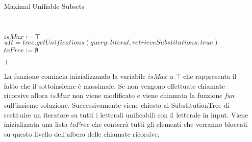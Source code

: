 \documentclass[./main.tex]{subfiles}
\begin{document}
\begin{algorithm}[H] \label{alg:mus}
    \caption{Maximal Unifiable Subsets}
    \\

$isMax := \top$\;
$uIt = tree.getUnifications(query: literal, retrieveSubstitutions: true)$\;
$toFree := \emptyset$\;

\Return $\top$\;
\end{algorithm}

La funzione comincia inizializzando la variabile $isMax$ a $\top$ che rappresenta il fatto che il sottoinsieme è massimale.
Se non vengono effettuate chiamate ricorsive allora $isMax$ non viene modificato
e viene chiamata la funzione \textit{fun} sull'insieme soluzione.
Successivamente viene chiesto al SubstitutionTree di restituire un iteratore
su tutti i letterali unificabili con il letterale in input.
Viene inizializzata una lista $toFree$ che conterrà tutti gli elementi che 
verranno bloccati su questo livello dell'albero delle chiamate ricorsive.
\end{document}
